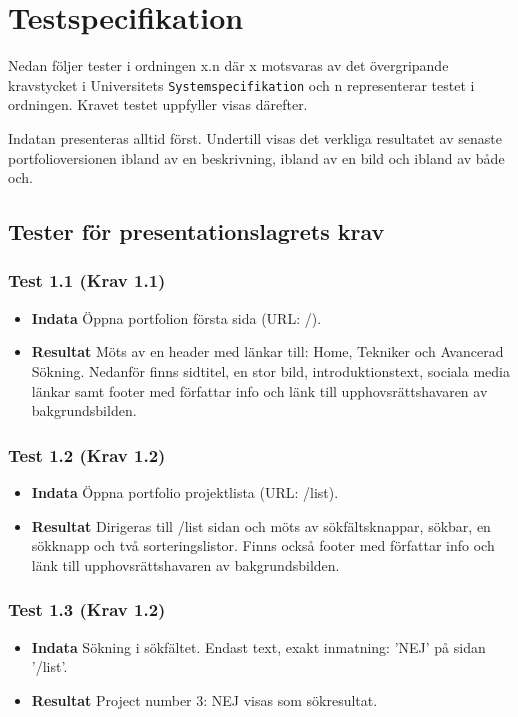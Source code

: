 \documentclass{TDP003mall}
\begin{document}
\section{Testspecifikation}
Nedan följer tester i ordningen x.n där x motsvaras av det övergripande kravstycket i Universitets \texttt{Systemspecifikation} och n representerar testet i ordningen. Kravet testet uppfyller visas därefter.

Indatan presenteras alltid först. Undertill visas det verkliga resultatet av senaste portfolioversionen ibland av en beskrivning, ibland av en bild och ibland av både och.
\subsection{Tester för presentationslagrets krav}
\subsubsection*{Test 1.1 (Krav 1.1)}
\begin{itemize}
\item[]\textbf{Indata} Öppna portfolion första sida (URL: /).
\item[]\textbf{Resultat} Möts av en header med länkar till: Home, Tekniker och Avancerad Sökning. Nedanför finns sidtitel, en stor bild, introduktionstext, sociala media länkar samt footer med författar info och länk till upphovsrättshavaren av bakgrundsbilden.
\end{itemize}
\subsubsection*{Test 1.2 (Krav 1.2)}
\begin{itemize}
\item[]\textbf{Indata} Öppna portfolio projektlista (URL: /list).
\item[]\textbf{Resultat} Dirigeras till /list sidan och möts av sökfältsknappar, sökbar, en sökknapp och två sorteringslistor. Finns också footer med författar info och länk till upphovsrättshavaren av bakgrundsbilden.
\end{itemize}
\subsubsection*{Test 1.3 (Krav 1.2)}
\begin{itemize}
\item[]\textbf{Indata} Sökning i sökfältet. Endast text, exakt inmatning: 'NEJ' på sidan '/list'.
\item[]\textbf{Resultat} Project number 3: NEJ visas som sökresultat.
\end{itemize} 
\end{document}

